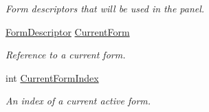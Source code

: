 \begin{DoxyCompactItemize}
\begin{DoxyCompactList}\small\item\em Form descriptors that will be used in the panel. \end{DoxyCompactList}\item 
\mbox{\hyperlink{class_wpf_handler_1_1_u_i_1_1_auto_layout_1_1_form_descriptor}{Form\+Descriptor}} \mbox{\hyperlink{class_wpf_handler_1_1_u_i_1_1_controls_1_1_logon_1_1_registration_panel_aaeba3a91188ece42efc57b8b0971a96e}{Current\+Form}}
\begin{DoxyCompactList}\small\item\em Reference to a current form. \end{DoxyCompactList}\item 
int \mbox{\hyperlink{class_wpf_handler_1_1_u_i_1_1_controls_1_1_logon_1_1_registration_panel_a2877930875198ac81185819216feb47c}{Current\+Form\+Index}}
\begin{DoxyCompactList}\small\item\em An index of a current active form. \end{DoxyCompactList}\end{DoxyCompactItemize}
